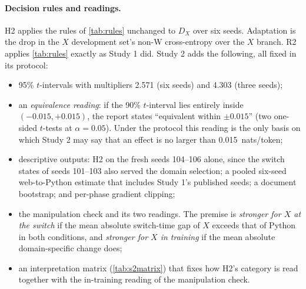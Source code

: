 \documentclass[11pt]{article}
\begin{document}
\paragraph{Decision rules and readings.} H2 applies the rules of \cref{tab:rules} unchanged to $D_X$ over six
seeds. Adaptation is the drop in the $X$ development set's non-W cross-entropy over the $X$ branch. R2 applies
\cref{tab:rules} exactly as Study 1 did. Study 2 adds the following, all fixed in its protocol:
\begin{itemize}[leftmargin=1.4em,itemsep=2pt]
  \item 95\% $t$-intervals with multipliers 2.571 (six seeds) and 4.303 (three seeds);
  \item an \emph{equivalence reading}: if the 90\% $t$-interval lies entirely inside $(-0.015, +0.015)$, the
        report states ``equivalent within $\pm 0.015$'' (two one-sided $t$-tests at $\alpha = 0.05$). Under the
        protocol this reading is the only basis on which Study 2 may say that an effect is no larger than
        0.015~nats/token;
  \item descriptive outputs: H2 on the fresh seeds 104--106 alone, since the switch states of seeds 101--103 also
        served the domain selection; a pooled six-seed web-to-Python estimate that includes Study 1's published
        seeds; a document bootstrap; and per-phase gradient clipping;
  \item the manipulation check and its two readings. The premise is \emph{stronger for $X$ at the switch} if the
        mean absolute switch-time gap of $X$ exceeds that of Python in both conditions, and \emph{stronger for $X$
        in training} if the mean absolute domain-specific change does;
  \item an interpretation matrix (\cref{tab:s2matrix}) that fixes how H2's category is read together with the
        in-training reading of the manipulation check.
\end{itemize}
\end{document}
